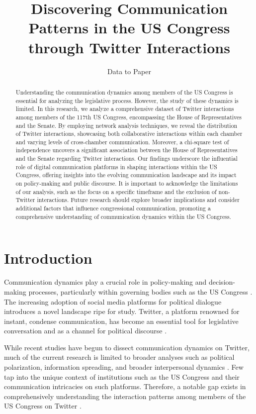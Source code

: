 \documentclass[11pt]{article}
\title{Discovering Communication Patterns in the US Congress through Twitter Interactions}
\author{Data to Paper}
\begin{document}
\maketitle
\begin{abstract}
Understanding the communication dynamics among members of the US Congress is essential for analyzing the legislative process. However, the study of these dynamics is limited. In this research, we analyze a comprehensive dataset of Twitter interactions among members of the 117th US Congress, encompassing the House of Representatives and the Senate. By employing network analysis techniques, we reveal the distribution of Twitter interactions, showcasing both collaborative interactions within each chamber and varying levels of cross-chamber communication. Moreover, a chi-square test of independence uncovers a significant association between the House of Representatives and the Senate regarding Twitter interactions. Our findings underscore the influential role of digital communication platforms in shaping interactions within the US Congress, offering insights into the evolving communication landscape and its impact on policy-making and public discourse. It is important to acknowledge the limitations of our analysis, such as the focus on a specific timeframe and the exclusion of non-Twitter interactions. Future research should explore broader implications and consider additional factors that influence congressional communication, promoting a comprehensive understanding of communication dynamics within the US Congress.
\end{abstract}
\section*{Introduction}

Communication dynamics play a crucial role in policy-making and decision-making processes, particularly within governing bodies such as the US Congress \cite{Theocharis2020TheDO}. The increasing adoption of social media platforms for political dialogue introduces a novel landscape ripe for study. Twitter, a platform renowned for instant, condense communication, has become an essential tool for legislative conversation and as a channel for political discourse \cite{Tsur2015AFO}.

While recent studies have begun to dissect communication dynamics on Twitter, much of the current research is limited to broader analyses such as political polarization, information spreading, and broader interpersonal dynamics \cite{Yarchi2020PoliticalPO, Wuchty2011HumanCD, Horvt2021BirdsOA}. Few tap into the unique context of institutions such as the US Congress and their communication intricacies on such platforms. Therefore, a notable gap exists in comprehensively understanding the interaction patterns among members of the US Congress on Twitter \cite{Lai2019TracingCP, Kenney2020COVID19AT}.
\end{document}
